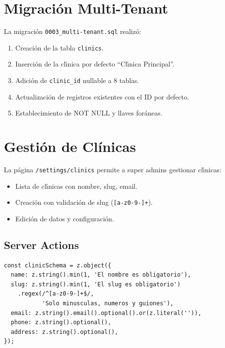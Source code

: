 \section{Migraci\'on Multi-Tenant}

La migraci\'on \texttt{0003\_multi-tenant.sql} realiz\'o:

\begin{enumerate}
    \item Creaci\'on de la tabla \texttt{clinics}.
    \item Inserci\'on de la cl\'{\i}nica por defecto ``Cl\'{\i}nica Principal''.
    \item Adici\'on de \texttt{clinic\_id} nullable a 8 tablas.
    \item Actualizaci\'on de registros existentes con el ID por defecto.
    \item Establecimiento de NOT NULL y llaves for\'aneas.
\end{enumerate}

\section{Gesti\'on de Cl\'inicas}

La p\'agina \texttt{/settings/clinics} permite a super admins gestionar
cl\'{\i}nicas:

\begin{itemize}[leftmargin=*]
    \item Lista de cl\'{\i}nicas con nombre, slug, email.
    \item Creaci\'on con validaci\'on de slug (\texttt{[a-z0-9-]+}).
    \item Edici\'on de datos y configuraci\'on.
\end{itemize}

\subsection{Server Actions}

\begin{lstlisting}[style=typescript, caption=Clinicas - Server actions con Zod]
const clinicSchema = z.object({
  name: z.string().min(1, 'El nombre es obligatorio'),
  slug: z.string().min(1, 'El slug es obligatorio')
    .regex(/^[a-z0-9-]+$/,
           'Solo minusculas, numeros y guiones'),
  email: z.string().email().optional().or(z.literal('')),
  phone: z.string().optional(),
  address: z.string().optional(),
});
\end{lstlisting}
